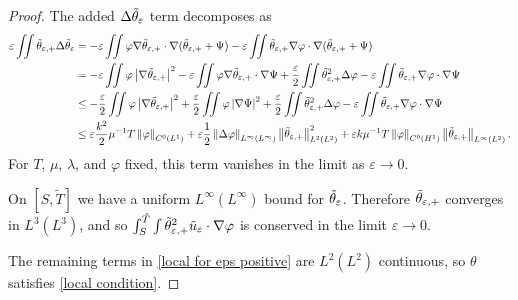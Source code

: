 \documentclass[11pt]{amsart}
\theoremstyle{remark}
\theoremstyle{definition}
\newcommand{\eps}{\varepsilon}
\newcommand{\norm}[1]{\left\lVert#1\right\rVert}
\newcommand{\abs}[1]{\left\lvert #1 \right\rvert}
\newcommand{\grad}{\nabla}
\newcommand{\Laplace}{\Delta}
\newcommand{\n}{^{-1}}
\begin{document}
\begin{proof}
The added $\Laplace \thetae$ term decomposes as
\[ \begin{aligned} 
\eps \iint \thetaep \Laplace \thetae &= -\eps \iint \varphi \grad \thetaep \cdot \grad (\thetaep + \Psi) - \eps \iint \thetaep \grad \varphi \cdot \grad (\thetaep + \Psi)
\\ &= -\eps \iint \varphi \abs{\grad \thetaep}^2 - \eps \iint \varphi \grad \thetaep \cdot \grad \Psi + \frac{\eps}{2} \iint \thetaep^2 \Laplace \varphi - \eps \iint \thetaep \grad\varphi \cdot \grad \Psi
\\ &\leq - \frac{\eps}{2} \iint \varphi \abs{\grad\thetaep}^2 + \frac{\eps}{2} \iint \varphi \abs{\grad\Psi}^2 + \frac{\eps}{2} \iint \thetaep^2 \Laplace \varphi - \eps \iint \thetaep \grad\varphi \cdot \grad \Psi
\\ &\leq \eps \frac{k^2}{2} \mu\n T \norm{\varphi}_{C^0(L^1)} + \eps \frac{1}{2}\norm{\Laplace \varphi}_{L^\infty(L^\infty)} \norm{\thetaep}_{L^2(L^2)}^2 + \eps k \mu\n T \norm{\varphi}_{C^0(H^1)} \norm{\thetaep}_{L^\infty(L^2)}.
\end{aligned} \]
For $T$, $\mu$, $\lambda$, and $\varphi$ fixed, this term vanishes in the limit as $\eps \to 0$.  

On $[S, \tilde{T}]$ we have a uniform $L^\infty(L^\infty)$ bound for $\thetae$. Therefore $\thetaep$ converges in $L^3(L^3)$, and so $\int_S^{\tilde{T}}\int \thetaep^2 \ue\cdot\grad\varphi$ is conserved in the limit $\eps \to 0$.  

The remaining terms in \eqref{local for eps positive} are $L^2(L^2)$ continuous, so $\theta$ satisfies \eqref{local condition}.  


\end{proof}
\end{document}

